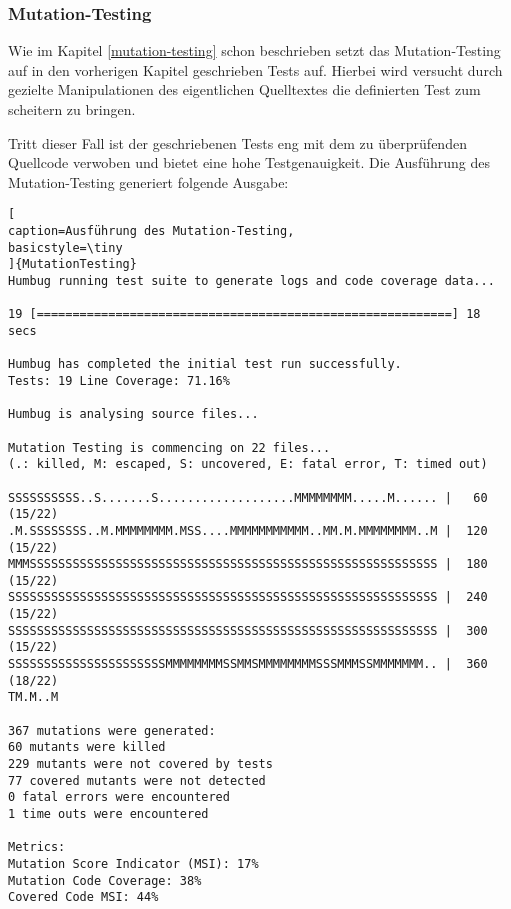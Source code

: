 



\subsubsection{Mutation-Testing}
Wie im Kapitel \ref*{mutation-testing} schon beschrieben setzt das Mutation-Testing auf in den vorherigen Kapitel geschrieben Tests auf. Hierbei wird versucht durch gezielte Manipulationen des eigentlichen Quelltextes die definierten Test zum scheitern zu bringen.

Tritt dieser Fall ist der geschriebenen Tests eng mit dem zu überprüfenden Quellcode verwoben und bietet eine hohe Testgenauigkeit. Die Ausführung des Mutation-Testing generiert folgende Ausgabe:


\begin{lstlisting}[
caption=Ausführung des Mutation-Testing,
basicstyle=\tiny
]{MutationTesting}
Humbug running test suite to generate logs and code coverage data...

19 [==========================================================] 18 secs

Humbug has completed the initial test run successfully.
Tests: 19 Line Coverage: 71.16%

Humbug is analysing source files...

Mutation Testing is commencing on 22 files...
(.: killed, M: escaped, S: uncovered, E: fatal error, T: timed out)

SSSSSSSSSS..S.......S...................MMMMMMMM.....M...... |   60 (15/22)
.M.SSSSSSSS..M.MMMMMMMM.MSS....MMMMMMMMMMM..MM.M.MMMMMMMM..M |  120 (15/22)
MMMSSSSSSSSSSSSSSSSSSSSSSSSSSSSSSSSSSSSSSSSSSSSSSSSSSSSSSSSS |  180 (15/22)
SSSSSSSSSSSSSSSSSSSSSSSSSSSSSSSSSSSSSSSSSSSSSSSSSSSSSSSSSSSS |  240 (15/22)
SSSSSSSSSSSSSSSSSSSSSSSSSSSSSSSSSSSSSSSSSSSSSSSSSSSSSSSSSSSS |  300 (15/22)
SSSSSSSSSSSSSSSSSSSSSSMMMMMMMMSSMMSMMMMMMMMSSSMMMSSMMMMMMM.. |  360 (18/22)
TM.M..M

367 mutations were generated:
60 mutants were killed
229 mutants were not covered by tests
77 covered mutants were not detected
0 fatal errors were encountered
1 time outs were encountered

Metrics:
Mutation Score Indicator (MSI): 17%
Mutation Code Coverage: 38%
Covered Code MSI: 44%
\end{lstlisting}

